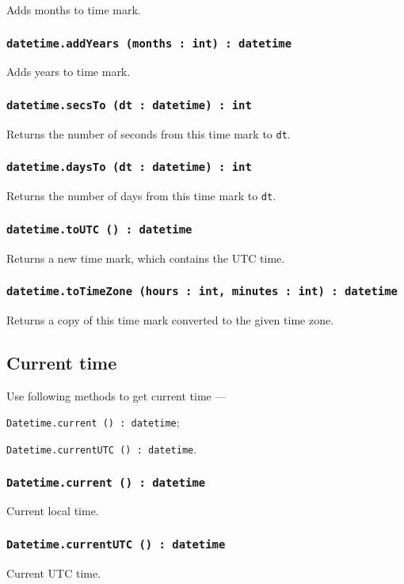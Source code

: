 Adds months to time mark.

\subsubsection{\texttt{datetime.addYears (months : int) : datetime}}

Adds years to time mark.

\subsubsection{\texttt{datetime.secsTo (dt : datetime) : int}}

Returns the number of seconds from this time mark to \texttt{dt}.

\subsubsection{\texttt{datetime.daysTo (dt : datetime) : int}}

Returns the number of days from this time mark to \texttt{dt}.

\subsubsection{\texttt{datetime.toUTC () : datetime}}

Returns a new time mark, which contains the UTC time.

\subsubsection{\texttt{datetime.toTimeZone (hours : int, minutes : int) : datetime}}

Returns a copy of this time mark converted to the given time zone.

\subsection{Current time}

Use following methods to get current time —
\begin{icItems}
	\item \texttt{Datetime.current () : datetime};
	\item \texttt{Datetime.currentUTC () : datetime}.
\end{icItems}

\subsubsection{\texttt{Datetime.current () : datetime}}

Current local time.

\subsubsection{\texttt{Datetime.currentUTC () : datetime}}

Current UTC time.
